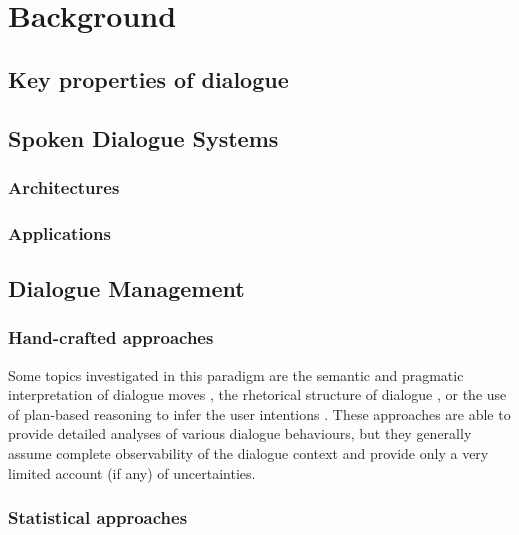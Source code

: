 
\chapter{Background}

\section{Key properties of dialogue}



\section{Spoken Dialogue Systems}
 
\subsection{Architectures}

\subsection{Applications}

\section{Dialogue Management}

\subsection{Hand-crafted approaches}

Some topics investigated in this paradigm are the semantic and pragmatic interpretation of dialogue moves \citep{ThomasonManuscript-THOEUA,Ginzburg2012}, the rhetorical structure of dialogue \citep{0521659515}, or the use of plan-based reasoning to infer the user intentions \citep{Allen1980,Litman87}.  These approaches are able to provide detailed analyses of various dialogue behaviours, but they generally assume complete observability of the dialogue context and provide only a very limited account (if any) of uncertainties.



\subsection{Statistical approaches}


